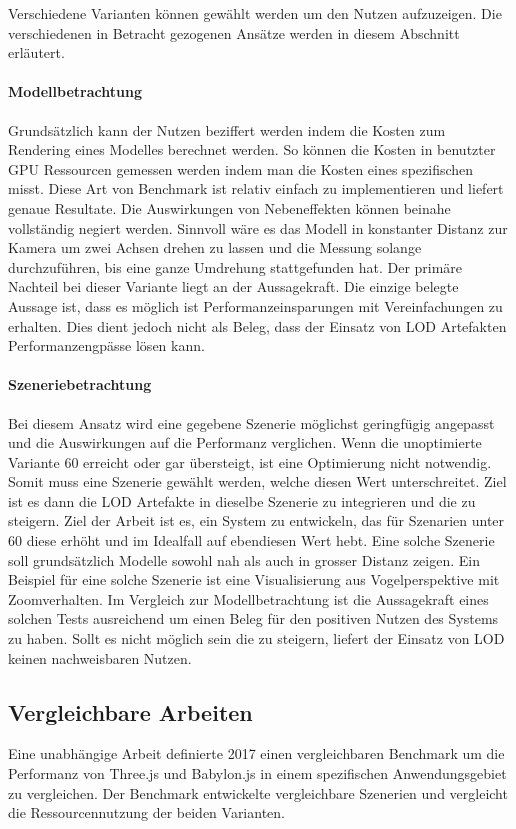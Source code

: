Verschiedene Varianten können gewählt werden um den Nutzen aufzuzeigen. Die verschiedenen in Betracht gezogenen Ansätze werden in diesem Abschnitt erläutert.

\paragraph{Modellbetrachtung}
Grundsätzlich kann der Nutzen beziffert werden indem die Kosten zum Rendering eines Modelles berechnet werden. So können die Kosten in benutzter GPU Ressourcen gemessen werden indem man die Kosten eines spezifischen  misst. Diese Art von Benchmark ist relativ einfach zu implementieren und liefert genaue Resultate. Die Auswirkungen von Nebeneffekten können beinahe vollständig negiert werden.
Sinnvoll wäre es das Modell in konstanter Distanz zur Kamera um zwei Achsen drehen zu lassen und die Messung solange durchzuführen, bis eine ganze Umdrehung stattgefunden hat.
Der primäre Nachteil bei dieser Variante liegt an der Aussagekraft. Die einzige belegte Aussage ist, dass es möglich ist Performanzeinsparungen mit Vereinfachungen zu erhalten. Dies dient jedoch nicht als Beleg, dass der Einsatz von LOD Artefakten Performanzengpässe lösen kann.

\paragraph{Szeneriebetrachtung}
Bei diesem Ansatz wird eine gegebene Szenerie möglichst geringfügig angepasst und die Auswirkungen auf die Performanz verglichen.
Wenn die unoptimierte Variante 60  erreicht oder gar übersteigt, ist eine Optimierung nicht notwendig. Somit muss eine Szenerie gewählt werden, welche diesen Wert unterschreitet. 
Ziel ist es dann die LOD Artefakte in dieselbe Szenerie zu integrieren und die  zu steigern. Ziel der Arbeit ist es, ein System zu entwickeln, das für Szenarien unter 60  diese erhöht und im Idealfall auf ebendiesen Wert hebt.
Eine solche Szenerie soll grundsätzlich Modelle sowohl nah als auch in grosser Distanz zeigen. Ein Beispiel für eine solche Szenerie ist eine Visualisierung aus Vogelperspektive mit Zoomverhalten.
Im Vergleich zur Modellbetrachtung ist die Aussagekraft eines solchen Tests ausreichend um einen Beleg für den positiven Nutzen des Systems zu haben. Sollt es nicht möglich sein die  zu steigern, liefert der Einsatz von LOD keinen nachweisbaren Nutzen.

\subsection{Vergleichbare Arbeiten}
Eine unabhängige Arbeit definierte 2017 einen vergleichbaren Benchmark um die Performanz von Three.js und Babylon.js in einem spezifischen Anwendungsgebiet zu vergleichen. Der Benchmark entwickelte vergleichbare Szenerien und vergleicht die Ressourcennutzung der beiden Varianten. \cite{performanceComparisonBabylonThreejs}

